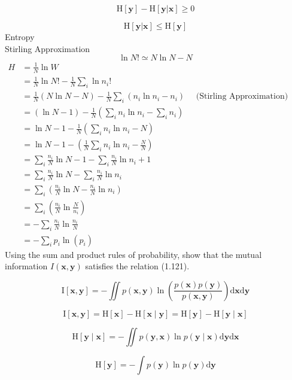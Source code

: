 \documentclass{article}
\begin{document}
$$\mathrm{H}[\mathbf{y}]-\mathrm{H}[\mathbf{y}|\mathbf{x}] \geq0$$

$$ \mathrm{H}[\mathbf{y}|\mathbf{x}] \leq \mathrm{H}[\mathbf{y}]$$
Entropy \\
Stirling Approximation
$$
\ln N ! \simeq N \ln N-N
$$
$\begin{aligned} H &=\frac{1}{N} \ln W \\ &=\frac{1}{N} \ln N !-\frac{1}{N} \sum_{i} \ln n_{i} ! \\ &=\frac{1}{N}(N \ln N-N)-\frac{1}{N} \sum_{i}\left(n_{i} \ln n_{i}-n_{i}\right) \quad \text { (Stirling Approximation) } \\ &=(\ln N-1)-\frac{1}{N}\left(\sum_{i} n_{i} \ln n_{i}-\sum_{i} n_{i}\right) \\ &=\ln N-1-\frac{1}{N}\left(\sum_{i} n_{i} \ln n_{i}-N\right) \\
&=\ln N-1-\left(\frac{1}{N} \sum_{i} n_{i} \ln n_{i}-\frac{N}{N}\right) \\
&=\sum_{i} \frac{n_{i}}{N} \ln N-1-\sum_{i} \frac{n_{i}}{N} \ln n_{i}+1 \\
&=\sum_{i} \frac{n_{i}}{N} \ln N-\sum_{i} \frac{n_{i}}{N} \ln n_{i} \\
&=\sum_{i}\left(\frac{n_{i}}{N} \ln N-\frac{n_{i}}{N} \ln n_{i}\right) \\
&=\sum_{i}\left(\frac{n_{i}}{N} \ln \frac{N}{n_{i}}\right) \\
&=-\sum_{i} \frac{n_{i}}{N} \ln \frac{n_{i}}{N}\\
&=-\sum_{i} p_i\ln(p_i)\end{aligned}$
 Using the sum and product rules of probability, show that the mutual information $I(\mathbf{x}, \mathbf{y})$ satisfies the relation (1.121).
 
 $$\mathrm{I}[\mathbf{x}, \mathbf{y}] =-\iint p(\mathbf{x}, \mathbf{y}) \ln \left(\frac{p(\mathbf{x}) p(\mathbf{y})}{p(\mathbf{x}, \mathbf{y})}\right) \mathrm{d} \mathbf{x} \mathrm{d} \mathbf{y} $$
 
 $$
 \mathrm{I}[\mathbf{x}, \mathbf{y}]=\mathrm{H}[\mathbf{x}]-\mathrm{H}[\mathbf{x} \mid \mathbf{y}]=\mathrm{H}[\mathbf{y}]-\mathrm{H}[\mathbf{y} \mid \mathbf{x}]
 $$
 
 $$\mathrm{H}[\mathbf{y} \mid \mathbf{x}]=-\iint p(\mathbf{y}, \mathbf{x}) \ln p(\mathbf{y} \mid \mathbf{x}) \mathrm{d} \mathbf{y} \mathrm{d} \mathbf{x}$$
 
 $$
 \mathrm{H}[\mathbf{y}]=-\int p(\mathbf{y}) \ln p(\mathbf{y}) \mathrm{d} \mathbf{y} $$
 
\end{document}
